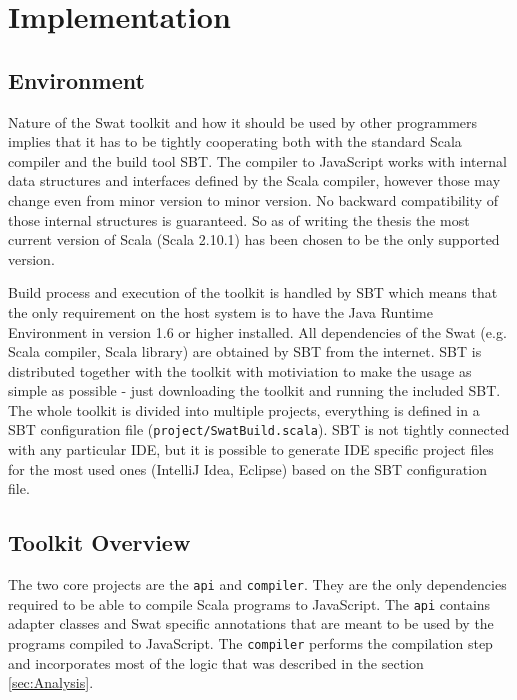 \documentclass[12pt,a4paper]{report}
\begin{document}
\chapter{Implementation}

\section{Environment}

Nature of the Swat toolkit and how it should be used by other programmers implies that it has to be tightly cooperating both with the standard Scala compiler and the build tool SBT. The compiler to JavaScript works with internal data structures and interfaces defined by the Scala compiler, however those may change even from minor version to minor version. No backward compatibility of those internal structures is guaranteed. So as of writing the thesis the most current version of Scala (Scala 2.10.1) has been chosen to be the only supported version. 

Build process and execution of the toolkit is handled by SBT which means that the only requirement on the host system is to have the Java Runtime Environment in version 1.6 or higher installed. All dependencies of the Swat (e.g. Scala compiler, Scala library) are obtained by SBT from the internet. SBT is distributed together with the toolkit with motiviation to make the usage as simple as possible - just downloading the toolkit and running the included SBT. The whole toolkit is divided into multiple projects, everything is defined in a SBT configuration file (\texttt{project/SwatBuild.scala}). SBT is not tightly connected with any particular IDE, but it is possible to generate IDE specific project files for the most used ones (IntelliJ Idea, Eclipse) based on the SBT configuration file.

\section{Toolkit Overview}

The two core projects are the \texttt{api} and \texttt{compiler}. They are the only dependencies required to be able to compile Scala programs to JavaScript. The \texttt{api} contains adapter classes and Swat specific annotations that are meant to be used by the programs compiled to JavaScript. The \texttt{compiler} performs the compilation step and incorporates most of the logic that was described in the section \ref{sec:Analysis}.
\end{document}
